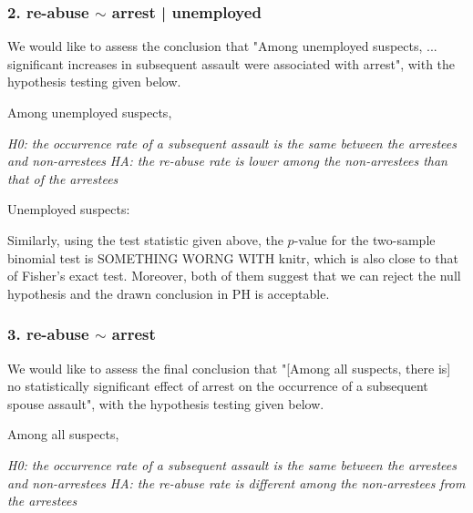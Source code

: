 \documentclass{article}
\newcommand{\rinline}[1]{SOMETHING WORNG WITH knitr}
\begin{document}
\subsubsection*{2. re-abuse $\sim$ arrest | unemployed}
\hspace{12 pt} We would like to assess the conclusion that "Among
unemployed suspects, ... significant increases in subsequent assault
were associated with arrest", with the hypothesis
testing given below.


Among unemployed suspects,


\hspace{12 pt} \textit{H0: the occurrence rate of a subsequent assault
  is the same between the arrestees and non-arrestees} \newline
\vspace{2 pt}
\hspace{24 pt} \textit{HA: the re-abuse rate is lower among the
  non-arrestees than that of the arrestees} \newline

\newpage
Unemployed suspects:


Similarly, using the test statistic given above, the $p$-value for the two-sample
binomial test is \rinline{pnorm(two.binom.test(cl2))}, which is also
close to that of Fisher's exact test. Moreover, both of them suggest that we can
reject the null hypothesis and the drawn conclusion in PH is acceptable.



\subsubsection*{3. re-abuse $\sim$ arrest}
\hspace{12 pt} We would like to assess the final conclusion that "[Among
all suspects, there is] no statistically significant effect of arrest
on the occurrence of a subsequent spouse assault", with the hypothesis
testing given below.


Among all suspects,


\hspace{12 pt} \textit{H0: the occurrence rate of a subsequent assault
  is the same between the arrestees and non-arrestees} \newline
\vspace{2 pt}
\hspace{24 pt} \textit{HA: the re-abuse rate is different among the
  non-arrestees from the arrestees} \newline
\end{document}
